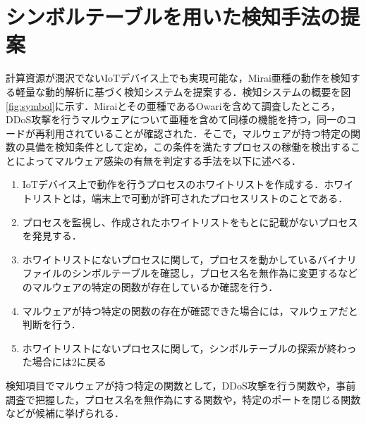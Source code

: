 \section{シンボルテーブルを用いた検知手法の提案}
計算資源が潤沢でないIoTデバイス上でも実現可能な，Mirai亜種の動作を検知する軽量な動的解析に基づく検知システムを提案する．検知システムの概要を図\ref{fig:symbol}に示す．Miraiとその亜種であるOwariを含めて調査したところ，DDoS攻撃を行うマルウェアについて亜種を含めて同様の機能を持つ，同一のコードが再利用されていることが確認された．そこで，マルウェアが持つ特定の関数の具備を検知条件として定め，この条件を満たすプロセスの稼働を検出することによってマルウェア感染の有無を判定する手法を以下に述べる．\\

\begin{enumerate}
 \item IoTデバイス上で動作を行うプロセスのホワイトリストを作成する．ホワイトリストとは，端末上で可動が許可されたプロセスリストのことである．
 \item プロセスを監視し、作成されたホワイトリストをもとに記載がないプロセスを発見する．
 \item ホワイトリストにないプロセスに関して，プロセスを動かしているバイナリファイルのシンボルテーブルを確認し，プロセス名を無作為に変更するなどのマルウェアの特定の関数が存在しているか確認を行う．
\item マルウェアが持つ特定の関数の存在が確認できた場合には，マルウェアだと判断を行う．
 \item ホワイトリストにないプロセスに関して，シンボルテーブルの探索が終わった場合には2に戻る
\end{enumerate}

 検知項目でマルウェアが持つ特定の関数として，DDoS攻撃を行う関数や，事前調査で把握した，プロセス名を無作為にする関数や，特定のポートを閉じる関数などが候補に挙げられる．
 
